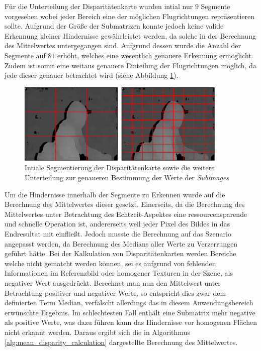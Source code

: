 \noindent
Für die Unterteilung der Disparitätenkarte wurden intial nur $9$ Segmente vorgesehen wobei jeder Bereich eine der möglichen Flugrichtungen repräsentieren sollte. Aufgrund der Größe der Submatrizen konnte jedoch keine valide Erkennung kleiner Hindernisse gewährleistet werden, da solche in der Berechnung des Mittelwertes untergegangen sind. Aufgrund dessen wurde die Anzahl der Segmente auf $81$ erhöht, welches eine wesentlich genauere Erkennung ermöglicht. Zudem ist somit eine weitaus genauere Einteilung der Flugrichtungen möglich, da jede dieser genauer betrachtet wird (siehe Abbildung \ref{fig:subimage_detection_segments}).\\

\begin{figure}[h]
	\begin{center}
		\includegraphics[width=10cm]{img/subimage_segmentation.pdf}
	\end{center}
	\caption{Intiale Segmentierung der Disparitätenkarte sowie die weitere Unterteilung zur genaueren Bestimmung der Werte der \emph{Subimages}}
	\label{fig:subimage_detection_segments}
\end{figure}

\noindent
Um die Hindernisse innerhalb der Segmente zu Erkennen wurde auf die Berechnung des Mittelwertes dieser gesetzt. Einerseits, da die Berechnung des Mittelwertes unter Betrachtung des Echtzeit-Aspektes eine ressourcensparende und schnelle Operation ist, andererseits weil jeder Pixel des Bildes in das Endresultat mit einfließt. Jedoch musste die Berechnung auf das Szenario angepasst werden, da Berechnung des Medians aller Werte zu Verzerrungen geführt hätte. Bei der Kalkulation von Disparitätenkarten werden Bereiche welche nicht gematcht werden können, sei es aufgrund von fehlenden Informationen im Referenzbild oder homogener Texturen in der Szene, als negativer Wert ausgedrückt. Berechnet man nun den Mittelwert unter Betrachtung positiver und negativer Werte, so entspricht dies zwar dem definierten Term Median, verfälscht allerdings das in diesem Anwendungsbereich erwünschte Ergebnis. Im schlechtesten Fall enthält eine Submatrix mehr negative als positive Werte, was dazu führen kann das Hindernisse vor homogenen Flächen nicht erkannt werden. Daraus ergibt sich die in Algorithmus \ref{alg:mean_disparity_calculation} dargestellte Berechnung des Mittelwertes.\\

